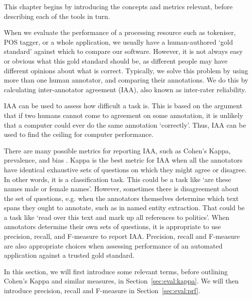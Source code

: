 This chapter begins by introducing the concepts and metrics relevant, before
describing each of the tools in turn.



When we evaluate the performance of a processing resource such as tokeniser, POS
tagger, or a whole application, we usually have a human-authored `gold standard'
against which to compare our software. However, it is not always easy or obvious
what this gold standard should be, as different people may have different
opinions about what is correct. Typically, we solve this problem by using more
than one human annotator, and comparing their annotations. We do this by
calculating inter-annotator agreement (IAA), also known as inter-rater reliability.

IAA can be used to assess how difficult a task is. This is based on the argument
that if two humans cannot come to agreement on some annotation, it is unlikely
that a computer could ever do the same annotation `correctly'. Thus, IAA can be
used to find the ceiling for computer performance.

There are many possible metrics for reporting IAA, such as Cohen's Kappa,
prevalence, and bias \cite{Eugenio04}. Kappa is the best metric for IAA when all
the annotators have identical exhaustive sets of questions on which they might
agree or disagree. In other words, it is a classification task. This could be a
task like `are these names male or female names'. However, sometimes there is
disagreement about the set of questions, e.g. when the annotators themselves
determine which text spans they ought to annotate, such as in named entity
extraction. That could be a task like `read over this text and mark up all
references to politics'. When annotators determine their own sets of questions,
it is appropriate to use precision, recall, and F-measure to report IAA.
Precision, recall and F-measure are also appropriate choices when assessing
performance of an automated application against a trusted gold standard.

In this section, we will first introduce some relevant terms, before outlining
Cohen's Kappa and similar measures, in Section~\ref{sec:eval:kappa}. We will then
introduce precision, recall and F-measure in Section~\ref{sec:eval:prf}.

